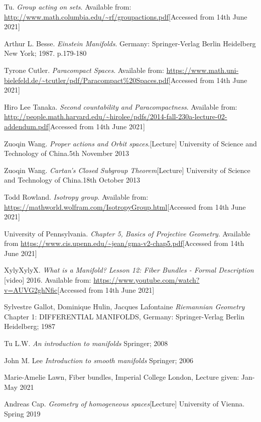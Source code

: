 \documentclass[12pt,twoside]{article}
\begin{document}
\begin{thebibliography}{999}
Tu.  \textit{Group acting on sets}. Available from:
\url{http://www.math.columbia.edu/~rf/groupactions.pdf}[Accessed from 14th June 2021]

Arthur L. Besse. \textit{Einstein Manifolds}. Germany: Springer-Verlag Berlin Heidelberg New York; 1987. p.179-180

Tyrone Cutler. \textit{Paracompact Spaces}. Available from: \url{https://www.math.uni-bielefeld.de/~tcutler/pdf/Paracompact\%20Spaces.pdf}[Accessed from 14th June 2021]

Hiro Lee Tanaka. \textit{Second countability and Paracompactness}. Available from: \url{http://people.math.harvard.edu/~hirolee/pdfs/2014-fall-230a-lecture-02-addendum.pdf}[Accessed from 14th June 2021]

Zuoqin Wang. \textit{Proper actions and Orbit spaces}.[Lecture] University of Science and Technology of China.5th November 2013

Zuoqin Wang. \textit{Cartan’s Closed Subgroup Theorem}[Lecture]  University of Science and Technology of China.18th October 2013

Todd Rowland. \textit{Isotropy group}. Available from: \url{https://mathworld.wolfram.com/IsotropyGroup.html}[Accessed from 14th June 2021]

University of Pennsylvania. \textit{Chapter 5, Basics of Projective Geometry}. Available from \url{https://www.cis.upenn.edu/~jean/gma-v2-chap5.pdf}[Accessed from 14th June 2021]

XylyXylyX. \textit{What is a Manifold? Lesson 12: Fiber Bundles - Formal Description} [video] 2016. Available from: \url{https://www.youtube.com/watch?v=AUVG2ghNfic}[Accessed from 14th June 2021]

Sylvestre Gallot, Dominique Hulin, Jacques Lafontaine \textit{Riemannian Geometry} Chapter 1: DIFFERENTIAL MANIFOLDS, Germany: Springer-Verlag Berlin Heidelberg; 1987

Tu L.W. \textit{An introduction to manifolds} Springer; 2008

John M. Lee \textit{Introduction to smooth manifolds} Springer; 2006

Marie-Amelie Lawn, Fiber bundles, Imperial College London, Lecture given: Jan-May 2021

Andreas Cap. \textit{Geometry of homogeneous spaces}[Lecture] University of Vienna. Spring 2019

\end{thebibliography}
\end{document}
